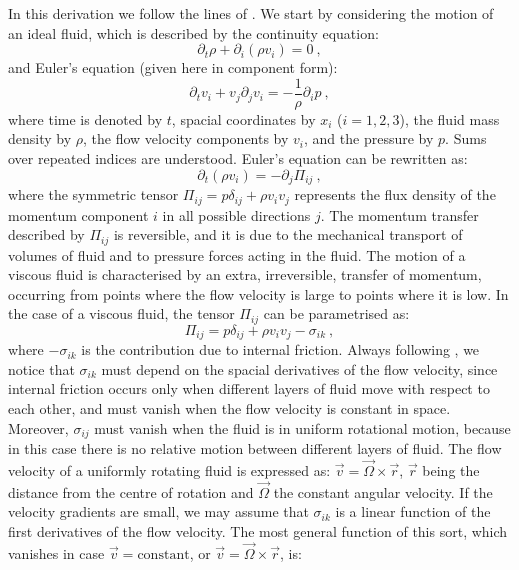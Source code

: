 In this derivation we follow the lines of \cite{landau2013fluid}. We start by considering the motion of an ideal fluid, which is described by the continuity equation:
\begin{equation}
\partial_t \rho + \partial_i (\rho v_i) = 0 \: ,
\end{equation}
%
and Euler's equation (given here in component form):
\begin{equation}
\partial_t v_i +  v_j \partial_j v_i = -\frac{1}{\rho} \partial_i p \: ,
\end{equation}
%
where time is denoted by $t$, spacial coordinates by $x_i$ ($i=1,2,3$), the fluid mass density by $\rho$, the flow velocity components by $v_i$,  and the pressure by $p$. Sums over repeated indices are understood. Euler's equation can be rewritten as:
\begin{equation}
\partial_t (\rho v_i) = - \partial_j \Pi_{ij} \: ,
\label{Euler}
\end{equation}
%
where the symmetric tensor $\Pi_{ij} = p \delta_{ij} + \rho v_i v_j$ represents the flux density of the momentum component $i$ in all possible directions $j$. The momentum transfer described by $\Pi_{ij}$ is reversible, and it is due to the mechanical transport of volumes of fluid and to pressure forces acting in the fluid. The motion of a viscous fluid is characterised by an extra, irreversible, transfer of momentum, occurring from points where the flow velocity is large to points where it is low.
In the case of a viscous fluid, the tensor $\Pi_{ij}$ can be parametrised as:
\begin{equation}
\Pi_{ij} = p \delta_{ij} + \rho v_i v_j - \sigma_{ik} \: ,
\end{equation}
%
where $-\sigma_{ik}$ is the contribution due to internal friction. Always following \cite{landau2013fluid}, we notice that $\sigma_{ik}$ must depend on the spacial derivatives of the flow velocity, since internal friction occurs only when different layers of fluid move with respect to each other, and must vanish when the flow velocity is constant in space. Moreover, $\sigma_{ij}$
must vanish when the fluid is in uniform rotational motion, because in this case there is no relative motion between different layers of fluid. The flow velocity of a uniformly rotating fluid is expressed as: $\vec v = \vec \Omega \times \vec r$, $\vec r$ being the distance from the centre of rotation and $\vec \Omega$ the constant angular velocity. If the velocity gradients are small, we may assume that $\sigma_{ik}$ is a linear function of the first derivatives of the flow velocity. The most general function of this sort, which vanishes in case $\vec v = \mathrm{constant}$, or $\vec v = \vec \Omega \times \vec r$, is:
